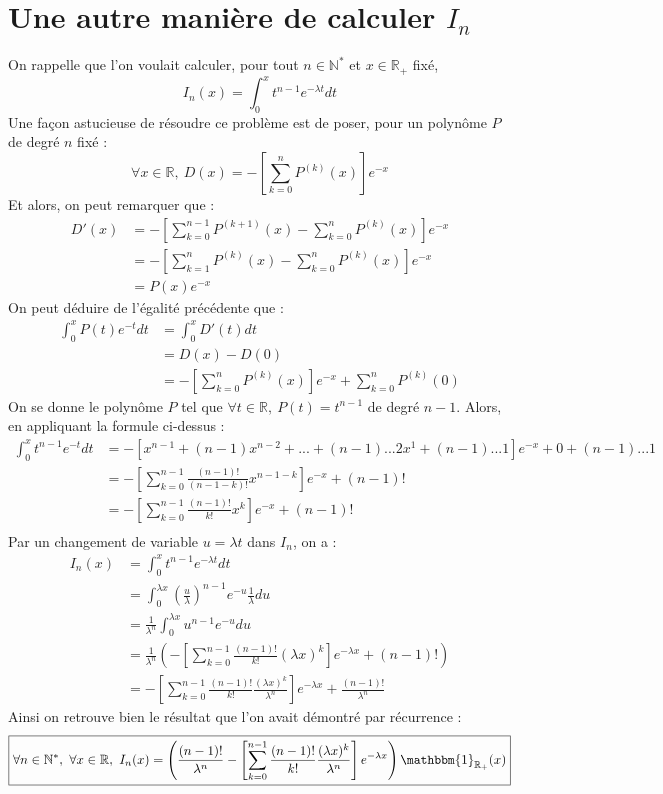 \documentclass[a4paper, titlepage]{livret} %
\begin{document}
	\chapter{Une autre manière de calculer $I_{n}$}
		On rappelle que l'on voulait calculer, pour tout $n \in \mathbb{N}^{*}$ et $x \in \mathbb{R}_{+}$ fixé,
		\[
			I_{n}(x) = \int_{0}^{x} t^{n-1} e^{-\lambda t}dt
		\]
		Une façon astucieuse de résoudre ce problème est de poser, pour un polynôme $P$ de degré $n$ fixé :
		\[
			\forall x \in \mathbb{R}, \ D(x) = -\left[\sum_{k = 0}^{n} P^{(k)}(x)\right]e^{-x}
		\]
		Et alors, on peut remarquer que :
		\[\begin{aligned}
			D'(x) & = -\left[\sum_{k = 0}^{n-1} P^{(k+1)}(x)-\sum_{k = 0}^{n} P^{(k)}(x)\right]e^{-x} \\
				  & = -\left[\sum_{k = 1}^{n} P^{(k)}(x)-\sum_{k = 0}^{n} P^{(k)}(x)\right]e^{-x}\\
				  & = P(x)e^{-x}
		\end{aligned}\]
		On peut déduire de l'égalité précédente que :
		\[\begin{aligned}
			\int_{0}^{x} P(t)e^{-t}dt & = \int_{0}^{x} D'(t)dt\\
								 	  & = D(x) - D(0)\\
								 	  & = -\left[\sum_{k = 0}^{n} P^{(k)}(x)\right]e^{-x} + \sum_{k = 0}^{n} P^{(k)}(0)
		\end{aligned}\]
		On se donne le polynôme $P$ tel que $\forall t \in \mathbb{R}, \ P(t) = t^{n-1}$ de degré $n - 1$.
		Alors, en appliquant la formule ci-dessus :
		\[\begin{aligned}
			\int_{0}^{x} t^{n-1}e^{-t}dt & = -\left[x^{n-1} + (n-1)x^{n-2} + ... + (n-1)...2 x^{1} + (n-1)...1\right]e^{-x} + 0 + (n-1)...1\\
										 & = -\left[\sum_{k = 0}^{n-1} \frac{(n-1)!}{(n-1-k)!} x^{n-1-k}\right]e^{-x} + (n-1)!\\
										 & = -\left[\sum_{k = 0}^{n-1} \frac{(n-1)!}{k!} x^{k}\right]e^{-x} + (n-1)!\\
		\end{aligned}\]
		Par un changement de variable $u = \lambda t$ dans $I_{n}$, on a :
		\[\begin{aligned}
			I_{n}(x) & = \int_{0}^{x} t^{n-1} e^{-\lambda t}dt\\
					 & = \int_{0}^{\lambda x} (\frac{u}{\lambda})^{n-1} e^{-u}\frac{1}{\lambda}du\\
					 & = \frac{1}{\lambda^{n}}\int_{0}^{\lambda x} u^{n-1} e^{-u}du\\
					 & = \frac{1}{\lambda^{n}} \left(-\left[\sum_{k = 0}^{n-1} \frac{(n-1)!}{k!} (\lambda x)^{k}\right]e^{-\lambda x} + (n-1)!\right)\\
					 & = -\left[\sum_{k = 0}^{n-1} \frac{(n-1)!}{k!} \frac{(\lambda x)^{k}}{\lambda^{n}}\right]e^{-\lambda x} + \frac{(n-1)!}{\lambda^{n}}
		\end{aligned}\]
		Ainsi on retrouve bien le résultat que l'on avait démontré par récurrence :
		\[\boxed{
			\forall n \in \mathbb{N}^{*}, \ \forall x \in \mathbb{R}, \ I_{n}(x) = \left(\frac{(n-1)!}{\lambda^{n}} -\left[\sum_{k = 0}^{n-1} \frac{(n-1)!}{k!} \frac{(\lambda x)^{k}}{\lambda^{n}}\right]e^{-\lambda x}\right)\mathbbm{1}_{\mathbb{R}_{+}}(x)
		}\]
\end{document}

